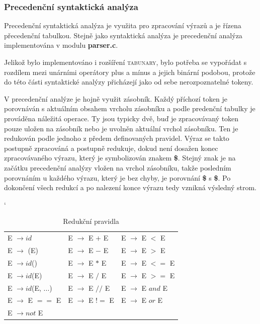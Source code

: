 \documentclass[12pt]{article}
\begin{document}
\subsubsection{Precedenční syntaktická analýza}
Precedenční syntaktická analýza je využita pro zpracování výrazů a je řízena přecedenční tabulkou. Stejně jako syntaktická analýza je precedenční analýza implementována v modulu \textbf{parser.c}.

Jelikož bylo implementováno i rozšíření \textsc{tabunary}, bylo potřeba se vypořádat s rozdílem mezi unárními operátory plus a mínus a jejich binární podobou, protože do této části syntaktické analýzy přicházejí jako od sebe nerozpoznatelné tokeny. 

V precedenční analýze je hojně využit zásobník. Každý příchozí token je porovnáván s aktuálním obsahem vrcholu zásobníku a podle predenční tabulky je prováděna náležitá operace. Ty jsou typicky dvě, buď je zpracovávaný token pouze uložen na zásobník nebo je uvolněn aktuální vrchol zásobníku. Ten je redukován podle jednoho z předem definovaných pravidel. Výraz se takto postupně zpracováná a postupně redukuje, dokud není dosažen konec zpracovávaného výrazu, který je symbolizován znakem \textbf{\$}. Stejný znak je na začátku precedenční analýzy vložen na vrchol zásobníku, takže posledním porovnáním u každého výrazu, který je bez chyby, je porovnání \textbf{\$} s \textbf{\$}. Po dokončení všech redukcí a po nalezení konce výrazu tedy vznikná výsledný strom.
\begin{table}[!htbp]
\catcode`
\centering
    \begin{tabular}{l l l}
         E $\rightarrow id$ & E $\rightarrow$ E $+$ E & E $\rightarrow$ E $<$ E \\
         E $\rightarrow $ (E) & E $\rightarrow$ E $-$ E & E $\rightarrow$ E $>$ E \\
         E $\rightarrow id$() & E $\rightarrow$ E $*$ E & E $\rightarrow$ E $<=$ E \\
         E $\rightarrow id$(E) & E $\rightarrow$ E $/$ E & E $\rightarrow$ E $>=$ E \\
         E $\rightarrow id$(E, ...) & E $\rightarrow$ E $//$ E & E $\rightarrow$ E $and$ E \\
         E $\rightarrow$ E $==$ E & E $\rightarrow$ E $!=$ E & E $\rightarrow$ E $or$ E \\
         E $\rightarrow not$ E & &  \\
    \end{tabular}
    \caption{Redukční pravidla}
    \label{tab:2}
\end{table}
\end{document}
